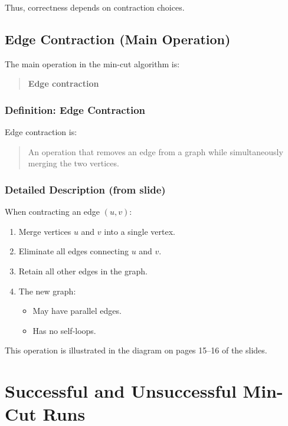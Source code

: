 \documentclass[12pt]{article}
\begin{document}
Thus, correctness depends on contraction choices.

\subsection{Edge Contraction (Main Operation)}

The main operation in the min-cut algorithm is:

\begin{quote}
\textbf{Edge contraction}
\end{quote}

\subsubsection*{Definition: Edge Contraction}

Edge contraction is:

\begin{quote}
An operation that removes an edge from a graph while simultaneously merging the two vertices.
\end{quote}

\subsubsection*{Detailed Description (from slide)}

When contracting an edge $(u, v)$:

\begin{enumerate}
    \item Merge vertices $u$ and $v$ into a single vertex.
    \item Eliminate all edges connecting $u$ and $v$.
    \item Retain all other edges in the graph.
    \item The new graph:
    \begin{itemize}
        \item May have parallel edges.
        \item Has no self-loops.
    \end{itemize}
\end{enumerate}

This operation is illustrated in the diagram on pages 15--16 of the slides.

\section{Successful and Unsuccessful Min-Cut Runs}
\end{document}
